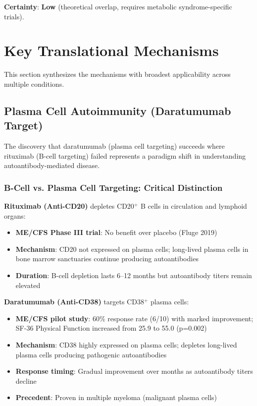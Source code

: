 \textbf{Certainty}: \textbf{Low} (theoretical overlap, requires metabolic syndrome-specific trials).

\section{Key Translational Mechanisms}
\label{sec:translational-mechanisms}

This section synthesizes the mechanisms with broadest applicability across multiple conditions.

\subsection{Plasma Cell Autoimmunity (Daratumumab Target)}
\label{sec:plasma-cell-translational}

The discovery that daratumumab (plasma cell targeting) succeeds where rituximab (B-cell targeting) failed represents a paradigm shift in understanding autoantibody-mediated disease.

\subsubsection{B-Cell vs. Plasma Cell Targeting: Critical Distinction}

\textbf{Rituximab (Anti-CD20)} depletes CD20$^+$ B cells in circulation and lymphoid organs:
\begin{itemize}
    \item \textbf{ME/CFS Phase III trial}: No benefit over placebo (Fluge 2019)
    \item \textbf{Mechanism}: CD20 not expressed on plasma cells; long-lived plasma cells in bone marrow sanctuaries continue producing autoantibodies
    \item \textbf{Duration}: B-cell depletion lasts 6--12 months but autoantibody titers remain elevated
\end{itemize}

\textbf{Daratumumab (Anti-CD38)} targets CD38$^+$ plasma cells:
\begin{itemize}
    \item \textbf{ME/CFS pilot study}: 60\% response rate (6/10) with marked improvement; SF-36 Physical Function increased from 25.9 to 55.0 (p=0.002)
    \item \textbf{Mechanism}: CD38 highly expressed on plasma cells; depletes long-lived plasma cells producing pathogenic autoantibodies
    \item \textbf{Response timing}: Gradual improvement over months as autoantibody titers decline
    \item \textbf{Precedent}: Proven in multiple myeloma (malignant plasma cells)
\end{itemize}

